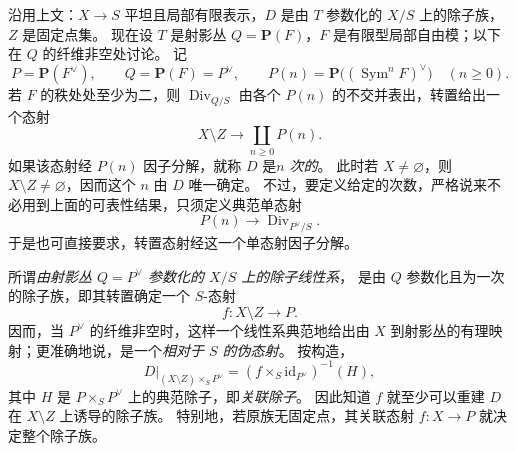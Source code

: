 \begingroup
\def\newscope{V-L}
\def\Div{\operatorname{Div}}
\def\Supp{\operatorname{Supp}}
\def\Ass{\operatorname{Ass}}
\def\Spec{\operatorname{Spec}}
\def\PP{\mathbf P}
\def\OO{\mathcal O}
沿用上文：\(X\to S\) 平坦且局部有限表示，\(D\) 是由 \(T\) 参数化的 \(X/S\) 上的除子族，\(Z\) 是固定点集。
现在设 \(T\) 是射影丛 \(Q=\PP(F)\)，\(F\) 是有限型局部自由模；以下在 \(Q\) 的纤维非空处讨论。
记
\[
 P=\PP(F^\vee),\qquad Q=\PP(F)=P^\vee,\qquad
 P(n)=\PP\bigl((\operatorname{Sym}^n F)^\vee\bigr)\quad(n\geq0).
\]
若 \(F\) 的秩处处至少为二，则 \(\Div_{Q/S}\) 由各个 \(P(n)\) 的不交并表出，转置给出一个态射
\[
 X\setminus Z\longrightarrow\coprod_{n\geq0}P(n).
\]
如果该态射经 \(P(n)\) 因子分解，就称 \(D\) 是\emph{\(n\) 次的}。
此时若 \(X\ne\varnothing\)，则 \(X\setminus Z\ne\varnothing\)，因而这个 \(n\) 由 \(D\) 唯一确定。
不过，要定义给定的次数，严格说来不必用到上面的可表性结果，只须定义典范单态射
\[
 P(n)\longrightarrow\Div_{P^\vee/S}.
\]
于是也可直接要求，转置态射经这一个单态射因子分解。

所谓\emph{由射影丛 \(Q=P^\vee\) 参数化的 \(X/S\) 上的除子线性系}，
是由 \(Q\) 参数化且为一次的除子族，即其转置确定一个 \(S\)-态射
\[
 f:X\setminus Z\longrightarrow P.
\]
因而，当 \(P^\vee\) 的纤维非空时，这样一个线性系典范地给出由 \(X\) 到射影丛的有理映射；更准确地说，是一个\emph{相对于 \(S\) 的伪态射}。
按构造，
\[
 D\big|_{(X\setminus Z)\times_S P^\vee}
 =
 (f\times_S\mathrm{id}_{P^\vee})^{-1}(H),
\]
其中 \(H\) 是 \(P\times_S P^\vee\) 上的典范除子，即\emph{关联除子}。
因此知道 \(f\) 就至少可以重建 \(D\) 在 \(X\setminus Z\) 上诱导的除子族。
特别地，若原族无固定点，其关联态射 \(f:X\to P\) 就决定整个除子族。

